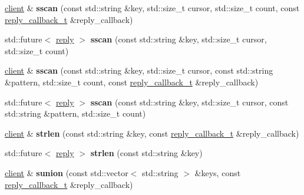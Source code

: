 \begin{DoxyCompactItemize}
\mbox{\hyperlink{classcpp__redis_1_1client}{client}} \& {\bfseries sscan} (const std\+::string \&key, std\+::size\+\_\+t cursor, std\+::size\+\_\+t count, const \mbox{\hyperlink{classcpp__redis_1_1client_af7a65eb21aa25230bfbb0b0203c4fc04}{reply\+\_\+callback\+\_\+t}} \&reply\+\_\+callback)
\item 
\mbox{\label{classcpp__redis_1_1client_af675aaaabeb7e4475e33612015030ece}} 
std\+::future$<$ \mbox{\hyperlink{classcpp__redis_1_1reply}{reply}} $>$ {\bfseries sscan} (const std\+::string \&key, std\+::size\+\_\+t cursor, std\+::size\+\_\+t count)
\item 
\mbox{\label{classcpp__redis_1_1client_a45f08a1f6086f2396ac4f01ddeee0485}} 
\mbox{\hyperlink{classcpp__redis_1_1client}{client}} \& {\bfseries sscan} (const std\+::string \&key, std\+::size\+\_\+t cursor, const std\+::string \&pattern, std\+::size\+\_\+t count, const \mbox{\hyperlink{classcpp__redis_1_1client_af7a65eb21aa25230bfbb0b0203c4fc04}{reply\+\_\+callback\+\_\+t}} \&reply\+\_\+callback)
\item 
\mbox{\label{classcpp__redis_1_1client_adec2116398026c986f041a91ef922ba7}} 
std\+::future$<$ \mbox{\hyperlink{classcpp__redis_1_1reply}{reply}} $>$ {\bfseries sscan} (const std\+::string \&key, std\+::size\+\_\+t cursor, const std\+::string \&pattern, std\+::size\+\_\+t count)
\item 
\mbox{\label{classcpp__redis_1_1client_ab7dab44434cee5e29e2bdf3c3be1df94}} 
\mbox{\hyperlink{classcpp__redis_1_1client}{client}} \& {\bfseries strlen} (const std\+::string \&key, const \mbox{\hyperlink{classcpp__redis_1_1client_af7a65eb21aa25230bfbb0b0203c4fc04}{reply\+\_\+callback\+\_\+t}} \&reply\+\_\+callback)
\item 
\mbox{\label{classcpp__redis_1_1client_a6b9f2a3a8952de874a9a6e1555c85195}} 
std\+::future$<$ \mbox{\hyperlink{classcpp__redis_1_1reply}{reply}} $>$ {\bfseries strlen} (const std\+::string \&key)
\item 
\mbox{\label{classcpp__redis_1_1client_a7128cdf97d9f768b117bab5843059fe1}} 
\mbox{\hyperlink{classcpp__redis_1_1client}{client}} \& {\bfseries sunion} (const std\+::vector$<$ std\+::string $>$ \&keys, const \mbox{\hyperlink{classcpp__redis_1_1client_af7a65eb21aa25230bfbb0b0203c4fc04}{reply\+\_\+callback\+\_\+t}} \&reply\+\_\+callback)

\end{DoxyCompactItemize}
